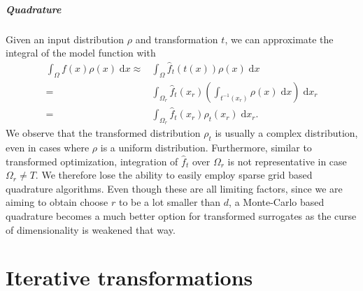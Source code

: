 \documentclass[
  a4paper,  %
  twoside,  %
  bibliography=totoc,
  headsepline,
  cleardoublepage=empty,
  parskip=half,
  draft=false
]{scrbook}
\begin{document}
\paragraph{Quadrature}
Given an input distribution $\rho$ and transformation $t$, we can approximate the integral of the model function with
\begin{equation}
\begin{split}
\int_{\Omega} f(x) \rho(x) \; \text{d}x \approx &\int_{\Omega} \hat{f}_t(t(x)) \rho(x) \; \text{d}x\\
=&\int_{\Omega_r} \hat{f}_t(x_r) \left(\int_{t^{-1}(x_r)} \rho(x)  \; \text{d}x \right)  \; \text{d}x_r\\
=&\int_{\Omega_r} \hat{f}_t(x_r) \rho_t(x_r) \; \text{d}x_r.
\end{split}
\end{equation}
We observe that the transformed distribution $\rho_t$ is usually a complex distribution, even in cases where $\rho$ is a uniform  distribution.
Furthermore, similar to transformed optimization, integration of $\hat{f}_t$ over $\Omega_r$ is not representative in case $\Omega_r \neq T$.
We therefore lose the ability to easily employ sparse grid based quadrature algorithms.
Even though these are all limiting factors, since we are aiming to obtain choose $r$ to be a lot smaller than $d$, a Monte-Carlo based quadrature becomes a much better option for transformed surrogates as the curse of dimensionality is weakened that way.

\chapter{Iterative transformations}
\label{chap:c5}
\end{document}

